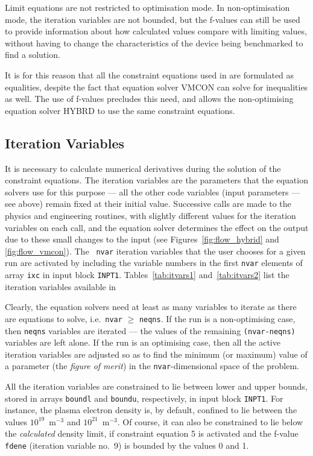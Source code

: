 Limit equations are not restricted to optimisation mode. In non-optimisation
mode, the iteration variables are not bounded, but the f-values can still be
used to provide information about how calculated values compare with limiting
values, without having to change the characteristics of the device being
benchmarked to find a solution.

It is for this reason that all the constraint equations used in \PS are
formulated as equalities, despite the fact that equation solver VMCON can
solve for inequalities as well. The use of f-values precludes this need, and
allows the non-optimising equation solver HYBRD to use the same constraint
equations.


\subsection{Iteration Variables}
\label{sec:itvars}

It is necessary to calculate numerical derivatives during the solution of the
constraint equations. The iteration variables are the parameters that the
equation solvers use for this purpose --- all the other code variables (input
parameters --- see above) remain fixed at their initial value. Successive
calls are made to the physics and engineering routines, with slightly
different values for the iteration variables on each call, and the equation
solver determines the effect on the output due to these small changes to the
input (see Figures~\ref{fig:flow_hybrid} and \ref{fig:flow_vmcon}). The {\tt
nvar} iteration variables that the user chooses for a given run are activated
by including the variable numbers in the first {\tt nvar} elements of array
{\tt ixc} in input block {\tt INPT1}. Tables~\ref{tab:itvars1}
and~\ref{tab:itvars2} list the iteration variables available in \PSD

Clearly, the equation solvers need at least as many variables to iterate as
there are equations to solve, i.e.\ {\tt nvar} $\geq$ {\tt neqns}. If the run
is a non-optimising case, then {\tt neqns} variables are iterated --- the
values of the remaining {\tt (nvar-neqns)} variables are left alone. If the
run is an optimising case, then all the active iteration variables are
adjusted so as to find the minimum (or maximum) value of a parameter (the {\em
figure of merit}) in the {\tt nvar}-dimensional space of the problem.

All the iteration variables are constrained to lie between lower and upper
bounds, stored in arrays {\tt boundl} and {\tt boundu}, respectively, in input
block {\tt INPT1}. For instance, the plasma electron density is, by default,
confined to lie between the values $10^{19}$~m$^{-3}$ and
$10^{21}$~m$^{-3}$. Of course, it can also be constrained to lie below the
{\em calculated}\/ density limit, if constraint equation 5 is activated and
the f-value {\tt fdene} (iteration variable no.\ 9) is bounded by the values 0
and 1.

